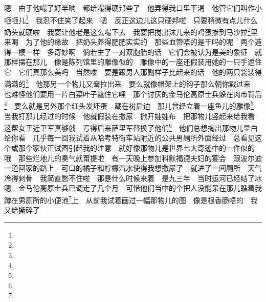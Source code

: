 \par 嗯　由于他嘬了好半晌　都给嘬得硬邦些了　他弄得我口里干渴　他管它们叫作小咂咂儿\footnote{}　我忍不住笑了起来　嗯　反正这边儿这只硬邦啦　只要稍微有点儿什么奶头就硬啦　我要让他老是这么嘬下去　我要把搅出沫儿来的鸡蛋掺到马沙拉\footnote{}里来喝　为了他的缘故　把奶头养得肥肥实实的　那些血管唔的是干吗的呢　两个造得一模一样　多奇妙啊　倘若生了一对双胞胎的话　它们会被认为是美的象征　就那样摆在那儿　像是陈列馆里的雕像似的　雕像中的一座还假装用她的一只手遮住它　它们真那么美吗　当然喽　要是跟男人那副样子比起来的话　他的两只袋装得满满的\footnote{}　他那另一个物儿又耷拉出来　要么就像帽架上的钩子那么朝你戳过来　也难怪他们要用一片白菜叶子遮住它哩　那个讨厌的金马伦高原士兵躲在肉市背后\footnote{}　要么就是另外那个红头发坏蛋　藏在树后边　那儿曾经立着一座鱼儿的雕像\footnote{}　当我打那儿经过的时候　他就假装在撒尿　掀开娃娃布　把那物儿竖起来给我看　这帮女王近卫军真够戗　亏得后来萨里军替换了他们\footnote{}　他们总想掏出那物儿显白给你看　几乎每一回我试着从哈考特街车站附近的公共男厕所外面经过　总看见这个或那个家伙正试图引起我的注意　就好像那物儿是世界七大奇迹中的一件似的　哦　那些烂地儿的臭气就甭提啦　有一天晚上参加科默福德夫妇的宴会　跟波尔迪一道回家的路上　可口的橘子和柠檬汽水使得我想撒尿了　就进了一间厕所　天气冷得刺骨　我简直憋不住啦　那是什么时候来着　是九三年　当时运河已经结了冰　嗯　金马伦高原士兵已调走了几个月　可惜他们当中的个把人没能呆在那儿瞧着我蹲在男厕所的小便池\footnote{}上　从前我试着画过一幅那物儿的图　像是根香肠唔的　我又给撕碎了　
